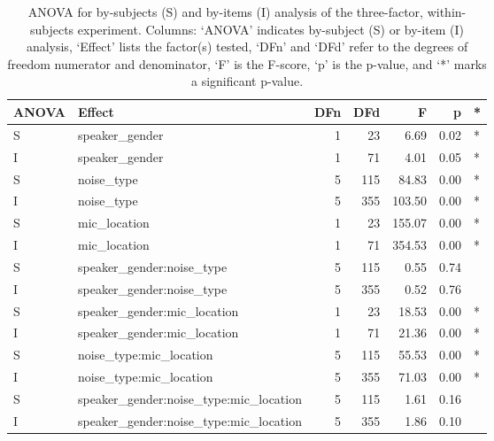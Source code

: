 \begin{table}[ht]
\centering
\begin{tabular}{llrrrrl}
  \hline
ANOVA & Effect & DFn & DFd & F & p & * \\ 
  \hline
S & speaker\_gender & 1 & 23 & 6.69 & 0.02 & * \\ 
  I & speaker\_gender & 1 & 71 & 4.01 & 0.05 & * \\ 
  S & noise\_type & 5 & 115 & 84.83 & 0.00 & * \\ 
  I & noise\_type & 5 & 355 & 103.50 & 0.00 & * \\ 
  S & mic\_location & 1 & 23 & 155.07 & 0.00 & * \\ 
  I & mic\_location & 1 & 71 & 354.53 & 0.00 & * \\ 
  S & speaker\_gender:noise\_type & 5 & 115 & 0.55 & 0.74 &  \\ 
  I & speaker\_gender:noise\_type & 5 & 355 & 0.52 & 0.76 &  \\ 
  S & speaker\_gender:mic\_location & 1 & 23 & 18.53 & 0.00 & * \\ 
  I & speaker\_gender:mic\_location & 1 & 71 & 21.36 & 0.00 & * \\ 
  S & noise\_type:mic\_location & 5 & 115 & 55.53 & 0.00 & * \\ 
  I & noise\_type:mic\_location & 5 & 355 & 71.03 & 0.00 & * \\ 
  S & speaker\_gender:noise\_type:mic\_location & 5 & 115 & 1.61 & 0.16 &  \\ 
  I & speaker\_gender:noise\_type:mic\_location & 5 & 355 & 1.86 & 0.10 &  \\ 
   \hline
\end{tabular}
\caption{ANOVA for by-subjects (S) and by-items (I) analysis of the three-factor, within-subjects experiment. Columns: `ANOVA' indicates by-subject (S) or by-item (I) analysis, `Effect' lists the factor(s) tested, `DFn' and `DFd' refer to the degrees of freedom numerator and denominator, `F' is the F-score, `p' is the p-value, and `*' marks a significant p-value.} 
\label{tab:anova1}
\end{table}



